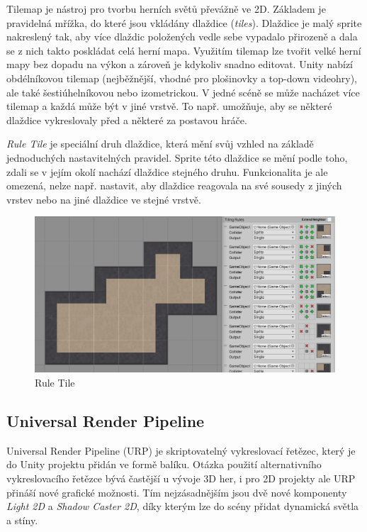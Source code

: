 \documentclass[FM,Proj,bw]{tulthesis}
\begin{document}
	Tilemap je nástroj pro tvorbu herních světů převážně ve 2D. Základem je pravidelná mřížka, do které jsou vkládány dlaždice (\textit{tiles}). Dlaždice je malý sprite nakreslený tak, aby více dlaždic položených vedle sebe vypadalo přirozeně a dala se z nich takto poskládat celá herní mapa. Využitím tilemap lze tvořit velké herní mapy bez dopadu na výkon a zároveň je kdykoliv snadno editovat. Unity nabízí obdélníkovou tilemap (nejběžnější, vhodné pro plošinovky a top-down videohry), ale také šestiúhelníkovou nebo izometrickou. V jedné scéně se může nacházet více tilemap a každá může být v jiné vrstvě. To např. umožňuje, aby se některé dlaždice vykreslovaly před a některé za postavou hráče.
	
	\textit{Rule Tile} je speciální druh dlaždice, která mění svůj vzhled na základě jednoduchých nastavitelných pravidel. Sprite této dlaždice se mění podle toho, zdali se v jejím okolí nachází dlaždice stejného druhu. Funkcionalita je ale omezená, nelze např. nastavit, aby dlaždice reagovala na své sousedy z jiných vrstev nebo na jiné dlaždice ve stejné vrstvě.
	
	\begin{figure}[ht]
		\centering
		\includegraphics[width=\textwidth]{img/RuleTile}
		\caption{Rule Tile}
	\end{figure}
	
	\subsection{Universal Render Pipeline}

	Universal Render Pipeline (URP) je skriptovatelný vykreslovací řetězec, který je do Unity projektu přidán ve formě balíku. Otázka použití alternativního vykreslovacího řetězce bývá častější u vývoje 3D her, i pro 2D projekty ale URP přináší nové grafické možnosti. Tím nejzásadnějším jsou dvě nové komponenty \textit{Light 2D} a \textit{Shadow Caster 2D}, díky kterým lze do scény přidat dynamická světla a stíny.
	
\end{document}
